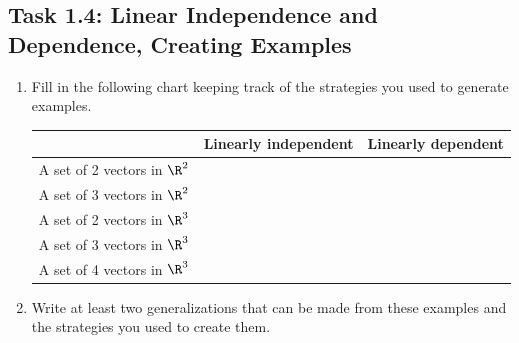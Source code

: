 \documentclass{problemset}
\begin{document}
\begin{iola}
\section*{Task 1.4: Linear Independence and Dependence, Creating Examples}



\begin{enumerate}
	\item Fill in the following chart keeping track of the strategies you used to generate
examples.

\vspace{2mm}

\begin{center}
\begin{tabular}{|c|c|c|}
	\hline
	&Linearly independent & Linearly dependent \\
	\hline
	A set of 2 vectors in $\R^2$ &&\\
	\hline
	A set of 3 vectors in $\R^2$ &&\\
	\hline
	A set of 2 vectors in $\R^3$ &&\\
	\hline
	A set of 3 vectors in $\R^3$ &&\\
	\hline
	A set of 4 vectors in $\R^3$ &&\\
	\hline
\end{tabular}
\end{center}
	
		\item Write at least two generalizations that can
			be made from these examples and the strategies you
			used to create them.

\end{enumerate}

\end{iola}
\end{document}
